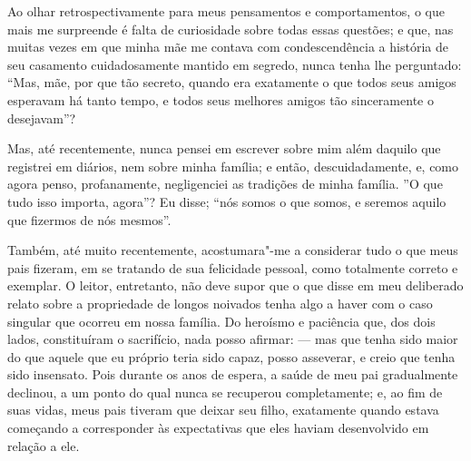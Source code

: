Ao olhar retrospectivamente para meus pensamentos e comportamentos,
o que mais me surpreende é falta de curiosidade sobre todas essas
questões; e que, nas muitas vezes em que minha mãe me contava com
condescendência a história de seu casamento cuidadosamente mantido em
segredo, nunca tenha lhe perguntado: ``Mas, mãe, por que tão secreto,
quando era exatamente o que todos seus amigos esperavam há tanto tempo,
e todos seus melhores amigos tão sinceramente o desejavam''?

Mas, até recentemente, nunca pensei em escrever sobre mim além daquilo
que registrei em diários, nem sobre minha família; e então,
descuidadamente, e, como agora penso, profanamente, negligenciei as
tradições de minha família. ''O que tudo isso importa, agora''? Eu
disse; ``nós somos o que somos, e seremos aquilo que fizermos de nós
mesmos''.

Também, até muito recentemente, acostumara"-me a considerar tudo o que
meus pais fizeram, em se tratando de sua felicidade pessoal, como
totalmente correto e exemplar. O leitor, entretanto, não deve supor que
o que disse em meu deliberado relato sobre a propriedade de longos
noivados tenha algo a haver com o caso singular que ocorreu em nossa
família. Do heroísmo e paciência que, dos dois lados, constituíram o
sacrifício, nada posso afirmar: --- mas que tenha sido maior do que
aquele que eu próprio teria sido capaz, posso asseverar, e creio que
tenha sido insensato. Pois durante os anos de espera, a saúde de meu pai
gradualmente declinou, a um ponto do qual nunca se recuperou
completamente; e, ao fim de suas vidas, meus pais tiveram que deixar seu
filho, exatamente quando estava começando a corresponder às expectativas
que eles haviam desenvolvido em relação a ele.

